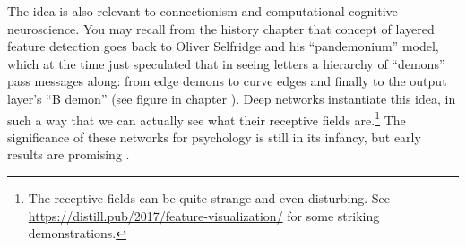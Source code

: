 The idea is also relevant to connectionism and computational cognitive neuroscience. You may recall from the history chapter that concept of layered feature detection goes  back to Oliver Selfridge and his ``pandemonium'' model, which at the time just speculated that in seeing letters a hierarchy of ``demons'' pass messages along: from edge demons to curve edges and finally to the output layer's ``B demon'' (see figure  in chapter ). Deep networks instantiate this idea, in such a way that we can actually  see what their receptive fields are.\footnote{The receptive fields can be quite strange and even disturbing. See \url{https://distill.pub/2017/feature-visualization/} for some striking demonstrations.}  The significance of these networks for psychology is still in its infancy, but early results are promising \cite{zorzi2013modeling, ritter2017cognitive}.
